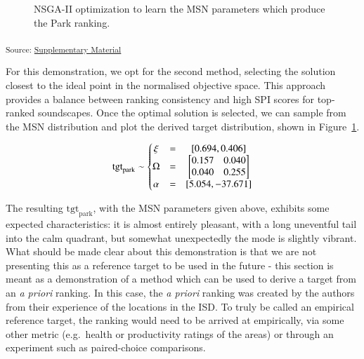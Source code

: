 \documentclass[
  authoryear,
  preprint,
  1p]{elsarticle}
\begin{document}
\begin{figure}
\begin{minipage}{0.50\linewidth}
{}


\end{minipage}%

\caption{\label{fig-pymoo-parks}NSGA-II optimization to learn the MSN
parameters which produce the Park ranking.}

\end{figure}%

\textsubscript{Source:
\href{https://MitchellAcoustics.github.io/J2401_JASA_SSID-Single-Index/notebooks/TargetOptimization-preview.html\#cell-fig-pymoo-parks}{Supplementary
Material }}

For this demonstration, we opt for the second method, selecting the
solution closest to the ideal point in the normalised objective space.
This approach provides a balance between ranking consistency and high
SPI scores for top-ranked soundscapes. Once the optimal solution is
selected, we can sample from the MSN distribution and plot the derived
target distribution, shown in Figure~\ref{fig-pymoo-parks}.

\[
\textup{tgt}_{\textup{park}} \sim  \left\{\begin{matrix}
    \xi&=&[0.694, 0.406] \\
    \Omega&=&\begin{bmatrix}
        0.157 & 0.040 \\ 
        0.040 & 0.255 
    \end{bmatrix} \\
    \alpha&=&[5.054, -37.671]
\end{matrix}\right.
\]

The resulting \(\text{tgt}_{\text{park}}\), with the MSN parameters
given above, exhibits some expected characteristics: it is almost
entirely pleasant, with a long uneventful tail into the calm quadrant,
but somewhat unexpectedly the mode is slightly vibrant. What should be
made clear about this demonstration is that we are not presenting this
as a reference target to be used in the future - this section is meant
as a demonstration of a method which can be used to derive a target from
an \emph{a priori} ranking. In this case, the \emph{a priori} ranking
was created by the authors from their experience of the locations in the
ISD. To truly be called an empirical reference target, the ranking would
need to be arrived at empirically, via some other metric (e.g.~health or
productivity ratings of the areas) or through an experiment such as
paired-choice comparisons.
\end{document}

